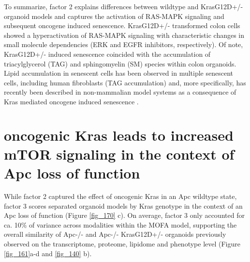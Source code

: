 \begin{flushleft}
\smallbreak
To summarize, factor 2 explains differences between wildtype and KrasG12D+/- organoid models and captures the activation of RAS-MAPK signaling and subsequent oncogene induced senescence. KrasG12D+/- transformed colon cells showed a hyperactivation of RAS-MAPK signaling with characteristic changes in small molecule dependencies (ERK and EGFR inhibitors, respectively). Of note, KrasG12D+/- induced senescence coincided with the accumulation of triacylglycerol (TAG) and sphingomyelin (SM) species within colon organoids. Lipid accumulation in senescent cells has been observed in multiple senescent cells, including human fibroblasts (TAG accumulation) \cite{Lizardo2017-uy} and, more specifically, has recently been described in non-mammalian model systems as a consequence of Kras mediated oncogene induced senescence \cite{Yao2018-ut}. 



\newpage
\section{oncogenic Kras leads to increased mTOR signaling in the context of Apc loss of function}

While factor 2 captured the effect of oncogenic Kras in an Apc wildtype state, factor 3 scores separated organoid models by Kras genotype in the context of an Apc loss of function (Figure \ref{fig_170} c). On average, factor 3 only accounted for ca. 10\% of variance across modalities within the MOFA model, supporting the overall similarity of Apc-/- and Apc-/- KrasG12D+/- organoids previously observed on the transcriptome, proteome, lipidome and phenotype level (Figure \ref{fig_161}a-d and \ref{fig_140} b).


\end{flushleft}
